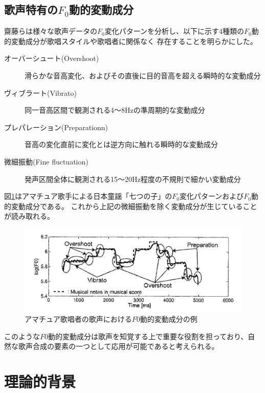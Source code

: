 \documentclass[10.5ptj,a4j,dvipdfmx,uplatex, oneside, openany, report]{jsbook}%
\begin{document}
\section{歌声特有の$F_0$動的変動成分}
齋藤らは様々な歌声データの$F_0$変化パターンを分析し、以下に示す4種類の$F_0$動的変動成分が歌唱スタイルや歌唱者に関係なく
存在することを明らかにした\cite{singbyspeaking}。
\begin{description}
    \item[オーバーシュート(Overshoot)]滑らかな音高変化、およびその直後に目的音高を超える瞬時的な変動成分
    \item[ヴィブラート(Vibrato)]同一音高区間で観測される4〜8Hzの準周期的な変動成分
    \item[プレパレーション(Preparationn)]音高の変化直前に変化とは逆方向に触れる瞬時的な変動成分
    \item[微細振動(Fine fluctuation)] 発声区間全体に観測される15〜20Hz程度の不規則で細かい変動成分
\end{description}

図\ref{f0_moving}はアマチュア歌手による日本童謡「七つの子」の$F_0$変化パターンおよび$F_0$動的変動成分である。
これから上記の微細振動を除く変動成分が生じていることが読み取れる。

\begin{figure}[htbp]
    \begin{center}
      \includegraphics[clip,width=12.0cm]{f0_moving.png}
      \caption{アマチュア歌唱者の歌声における$F0$動的変動成分の例\cite{singbyspeaking}}
      \label{f0_moving}
    \end{center}
\end{figure}

このような$F0$動的変動成分は歌声を知覚する上で重要な役割を担っており、自然な歌声合成の要素の一つとして応用が可能であると考えられる。




\chapter{理論的背景}
\end{document}
